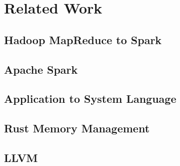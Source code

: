 \chapter{Related Work}
\label{chapter:relatedwork}
\thispagestyle{myheadings}

\graphicspath{{2_RelatedWork/Figures/}}

\section{Hadoop MapReduce to Spark}
\label{sec:history}


\section{Apache Spark}
\label{sec:history}


\section{Application to System Language}
\label{sec:history}


\section{Rust Memory Management}
\label{sec:history}


\section{LLVM}
\label{sec:history}


% 


% 

\clearpage



